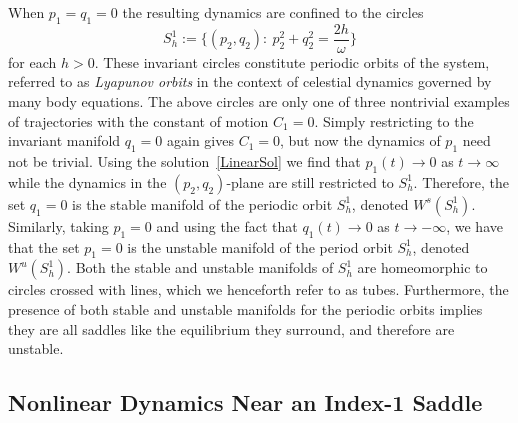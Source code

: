 \documentclass[11pt]{article}
\numberwithin{equation}{section}
\theoremstyle{plain}
\begin{document}
When $p_1 = q_1 = 0$ the resulting dynamics are confined to the circles
\begin{equation}
	S^1_h := \bigg\{(p_2,q_2):\ p_2^2 + q_2^2 = \frac{2h}{\omega}\bigg\}
\end{equation}
for each $h > 0$. These invariant circles constitute periodic orbits of the system, referred to as {\em Lyapunov orbits} in the context of celestial dynamics governed by many body equations. The above circles are only one of three nontrivial examples of trajectories with the constant of motion $C_1 = 0$. Simply restricting to the invariant manifold $q_1 = 0$ again gives $C_1 = 0$, but now the dynamics of $p_1$ need not be trivial. Using the solution~\eqref{LinearSol} we find that $p_1(t) \to 0$ as $t \to \infty$ while the dynamics in the $(p_2,q_2)$-plane are still restricted to $S^1_h$. Therefore, the set $q_1 = 0$ is the stable manifold of the periodic orbit $S^1_h$, denoted $W^s(S^1_h)$. Similarly, taking $p_1 = 0$ and using the fact that $q_1(t) \to 0$ as $t \to -\infty$, we have that the set $p_1 = 0$ is the unstable manifold of the period orbit $S^1_h$, denoted $W^u(S^1_h)$. Both the stable and unstable manifolds of $S^1_h$ are homeomorphic to circles crossed with lines, which we henceforth refer to as tubes. Furthermore, the presence of both stable and unstable manifolds for the periodic orbits implies they are all saddles like the equilibrium they surround, and therefore are unstable.   


\subsection{Nonlinear Dynamics Near an Index-1 Saddle}
\end{document}
